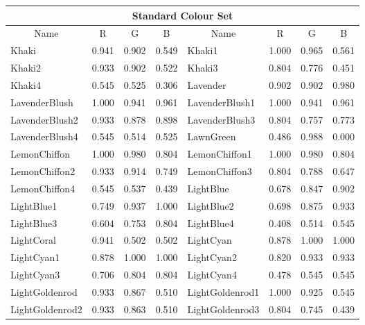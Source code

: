 {\begin{center}
\begin{tabular}{|l|l|l|l|l|l|l|l|}
\hline
\multicolumn{8}{|c|}{{\large Standard Colour Set}} \\ \hline
\multicolumn{1}{|c|}{Name} & \multicolumn{1}{|c|}{R} & \multicolumn{1}{c|}{G} &
\multicolumn{1}{c|}{B} & \multicolumn{1}{|c|}{Name} & \multicolumn{1}{c|}{R} &
\multicolumn{1}{c|}{G} & \multicolumn{1}{c|}{B}  \\ \hline
Khaki               & 0.941 & 0.902 & 0.549 & Khaki1              & 1.000 & 0.965 & 0.561 \\ 
Khaki2              & 0.933 & 0.902 & 0.522 & Khaki3              & 0.804 & 0.776 & 0.451 \\ 
Khaki4              & 0.545 & 0.525 & 0.306 & Lavender            & 0.902 & 0.902 & 0.980 \\ 
LavenderBlush       & 1.000 & 0.941 & 0.961 & LavenderBlush1      & 1.000 & 0.941 & 0.961 \\ 
LavenderBlush2      & 0.933 & 0.878 & 0.898 & LavenderBlush3      & 0.804 & 0.757 & 0.773 \\ 
LavenderBlush4      & 0.545 & 0.514 & 0.525 & LawnGreen           & 0.486 & 0.988 & 0.000 \\ 
LemonChiffon        & 1.000 & 0.980 & 0.804 & LemonChiffon1       & 1.000 & 0.980 & 0.804 \\ 
LemonChiffon2       & 0.933 & 0.914 & 0.749 & LemonChiffon3       & 0.804 & 0.788 & 0.647 \\ 
LemonChiffon4       & 0.545 & 0.537 & 0.439 & LightBlue           & 0.678 & 0.847 & 0.902 \\ 
LightBlue1          & 0.749 & 0.937 & 1.000 & LightBlue2          & 0.698 & 0.875 & 0.933 \\ 
LightBlue3          & 0.604 & 0.753 & 0.804 & LightBlue4          & 0.408 & 0.514 & 0.545 \\ 
LightCoral          & 0.941 & 0.502 & 0.502 & LightCyan           & 0.878 & 1.000 & 1.000 \\ 
LightCyan1          & 0.878 & 1.000 & 1.000 & LightCyan2          & 0.820 & 0.933 & 0.933 \\ 
LightCyan3          & 0.706 & 0.804 & 0.804 & LightCyan4          & 0.478 & 0.545 & 0.545 \\ 
LightGoldenrod      & 0.933 & 0.867 & 0.510 & LightGoldenrod1     & 1.000 & 0.925 & 0.545 \\ 
LightGoldenrod2     & 0.933 & 0.863 & 0.510 & LightGoldenrod3     & 0.804 & 0.745 & 0.439 \\ 

\end{tabular}
\end{center}}
